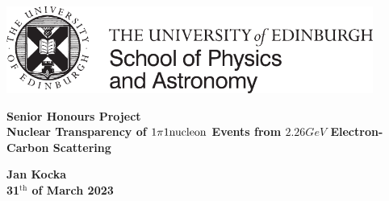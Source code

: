 \documentclass[a4paper,12pt]{article}
\newcommand{\efn}{e4$\nu$}
\begin{document}
\pagestyle{empty}
\par\noindent\includegraphics[width=12cm]{PandA_crest.pdf}
\par\noindent

\vspace*{2cm}

\begin{center}
        \Large\bf \Large\bf Senior Honours Project \\
        \LARGE\bf Nuclear Transparency of $1\pi1\text{\normalfont nucleon}$ Events from $2.26\si{GeV}$ Electron-Carbon Scattering
\end{center}

\vspace*{0.5cm}

\begin{center}
        \bf Jan Kocka \\
        31$^\text{th}$ of March 2023
\end{center}
\vspace*{5mm}

\begin{abstract}
    \noindent
    We outline the need for a better understanding of neutrino-nucleus interactions and how studying electron-nucleus interaction can be used for the purpose.
    It covers some of the prerequisites to understand such studies, including the most commonly studied interaction types and the use of Monte Carlo event generators like GENIE.
    An introduction to the CLAS6 data used by the \efn\ collaboration is presented and a new codebase using modern C\texttt{++} to analyse the data was developed.
    Finally we use this code to conduct a study of nuclear effects on the reconstruction of pion momentum of 1 pion 1 nucleon events (mainly from $\Delta_{1232}$ resonances) from GENIE generated 2.26\si{GeV} incident electron - carbon nucleus scattering.
    We identify errors of the reconstruction due to initial state effects and final state interactions, and show that even when accounting for detector precision such resolution may be possible to within 400 \si{Mev/c}.
\end{abstract}
\end{document}
